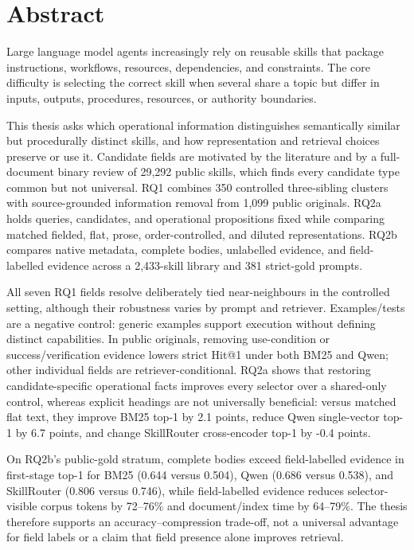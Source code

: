 \chapter*{Abstract}

Large language model agents increasingly rely on reusable skills that package instructions, workflows, resources, dependencies, and constraints. The core difficulty is selecting the correct skill when several share a topic but differ in inputs, outputs, procedures, resources, or authority boundaries.

This thesis asks which operational information distinguishes semantically similar but procedurally distinct skills, and how representation and retrieval choices preserve or use it. Candidate fields are motivated by the literature and by a full-document binary review of 29,292 public skills, which finds every candidate type common but not universal. RQ1 combines 350 controlled three-sibling clusters with source-grounded information removal from 1,099 public originals. RQ2a holds queries, candidates, and operational propositions fixed while comparing matched fielded, flat, prose, order-controlled, and diluted representations. RQ2b compares native metadata, complete bodies, unlabelled evidence, and field-labelled evidence across a 2,433-skill library and 381 strict-gold prompts.

All seven RQ1 fields resolve deliberately tied near-neighbours in the controlled setting, although their robustness varies by prompt and retriever. Examples/tests are a negative control: generic examples support execution without defining distinct capabilities. In public originals, removing use-condition or success/verification evidence lowers strict Hit@1 under both BM25 and Qwen; other individual fields are retriever-conditional. RQ2a shows that restoring candidate-specific operational facts improves every selector over a shared-only control, whereas explicit headings are not universally beneficial: versus matched flat text, they improve BM25 top-1 by 2.1 points, reduce Qwen single-vector top-1 by 6.7 points, and change SkillRouter cross-encoder top-1 by -0.4 points.

On RQ2b's public-gold stratum, complete bodies exceed field-labelled evidence in first-stage top-1 for BM25 (0.644 versus 0.504), Qwen (0.686 versus 0.538), and SkillRouter (0.806 versus 0.746), while field-labelled evidence reduces selector-visible corpus tokens by 72--76\% and document/index time by 64--79\%. The thesis therefore supports an accuracy--compression trade-off, not a universal advantage for field labels or a claim that field presence alone improves retrieval.
